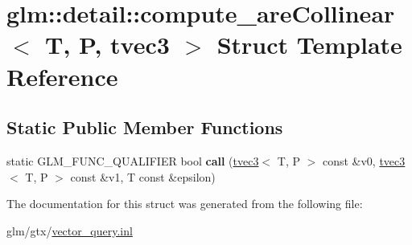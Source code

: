 \hypertarget{structglm_1_1detail_1_1compute__areCollinear_3_01T_00_01P_00_01tvec3_01_4}{\section{glm\-:\-:detail\-:\-:compute\-\_\-are\-Collinear$<$ T, P, tvec3 $>$ Struct Template Reference}
\label{structglm_1_1detail_1_1compute__areCollinear_3_01T_00_01P_00_01tvec3_01_4}
}
\subsection*{Static Public Member Functions}
\begin{DoxyCompactItemize}
\item 
\hypertarget{structglm_1_1detail_1_1compute__areCollinear_3_01T_00_01P_00_01tvec3_01_4_a4a9fce4b46bc6906c0b6b44c31accdb1}{static G\-L\-M\-\_\-\-F\-U\-N\-C\-\_\-\-Q\-U\-A\-L\-I\-F\-I\-E\-R bool {\bfseries call} (\hyperlink{structglm_1_1tvec3}{tvec3}$<$ T, P $>$ const \&v0, \hyperlink{structglm_1_1tvec3}{tvec3}$<$ T, P $>$ const \&v1, T const \&epsilon)}\label{structglm_1_1detail_1_1compute__areCollinear_3_01T_00_01P_00_01tvec3_01_4_a4a9fce4b46bc6906c0b6b44c31accdb1}

\end{DoxyCompactItemize}


The documentation for this struct was generated from the following file\-:\begin{DoxyCompactItemize}
\item 
glm/gtx/\hyperlink{vector__query_8inl}{vector\-\_\-query.\-inl}\end{DoxyCompactItemize}
